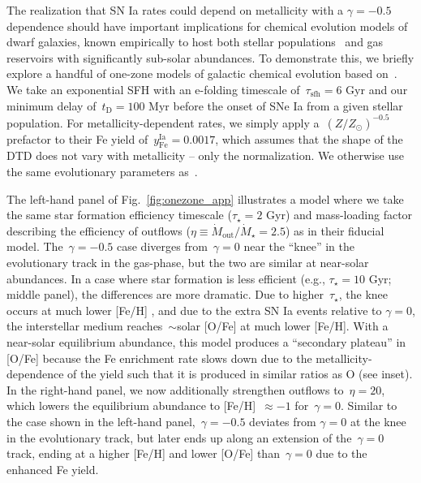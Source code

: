 \documentclass[ms.tex]{subfiles}
\begin{document}
The realization that SN Ia rates could depend on metallicity with a
$\gamma = -0.5$ dependence should have important implications for chemical
evolution models of dwarf galaxies, known empirically to host both stellar
populations~\citep{Gallazzi2005, Kirby2013} and gas reservoirs
\citep{Tremonti2004, Zahid2011, Andrews2013, Zahid2014} with significantly
sub-solar abundances.
To demonstrate this, we briefly explore a handful of one-zone models of
galactic chemical evolution based on~\citet{Johnson2020}.
We take an exponential SFH with an e-folding timescale of~$\tau_\text{sfh} = 6$
Gyr and our minimum delay of~$t_\text{D} = 100$ Myr before the onset of SNe Ia
from a given stellar population.
For metallicity-dependent rates, we simply apply a~$(Z / Z_\odot)^{-0.5}$
prefactor to their Fe yield of~$y_\text{Fe}^\text{Ia} = 0.0017$, which assumes
that the shape of the DTD does not vary with metallicity -- only the
normalization.
We otherwise use the same evolutionary parameters
as~\citet[][for details, see discussion in their~\S~2]{Johnson2020}.
\par
The left-hand panel of Fig.~\ref{fig:onezone_app} illustrates a model where we
take the same star formation efficiency timescale ($\tau_\star = 2$ Gyr) and
mass-loading factor describing the efficiency of outflows
($\eta \equiv \dot{M}_\text{out} / \dot{M}_\star = 2.5$) as in their fiducial
model.
The~$\gamma = -0.5$ case diverges from~$\gamma = 0$ near the ``knee''
in the evolutionary track in the gas-phase, but the two are similar at
near-solar abundances.
In a case where star formation is less efficient (e.g., $\tau_\star = 10$ Gyr;
middle panel), the differences are more dramatic.
Due to higher~$\tau_\star$, the knee occurs at much lower [Fe/H]
\citep{Weinberg2017}, and due to the extra SN Ia events relative to
$\gamma = 0$, the interstellar medium reaches~$\sim$solar [O/Fe] at much lower
[Fe/H].
With a near-solar equilibrium abundance, this model produces a ``secondary
plateau'' in [O/Fe] because the Fe enrichment rate slows down due to the
metallicity-dependence of the yield such that it is produced in similar ratios
as O (see inset).
In the right-hand panel, we now additionally strengthen outflows to~$\eta = 20$,
which lowers the equilibrium abundance to [Fe/H]~$\approx -1$ for~$\gamma = 0$.
Similar to the case shown in the left-hand panel,~$\gamma = -0.5$ deviates from
$\gamma = 0$ at the knee in the evolutionary track, but later ends up along an
extension of the~$\gamma = 0$ track, ending at a higher [Fe/H] and lower [O/Fe]
than~$\gamma = 0$ due to the enhanced Fe yield.
\end{document}

